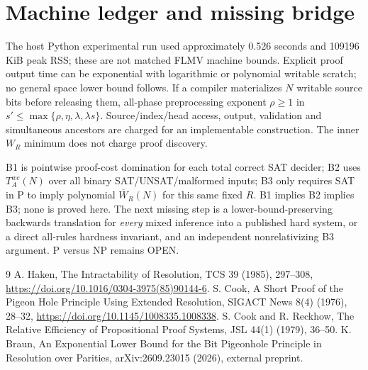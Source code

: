 \documentclass[11pt]{article}
\begin{document}
\section*{Machine ledger and missing bridge}
The host Python experimental run used approximately 0.526 seconds and 109196 KiB peak RSS; these are not matched FLMV machine bounds. Explicit proof output time can be exponential with logarithmic or polynomial writable scratch; no general space lower bound follows. If a compiler materializes $N$ writable source bits before releasing them, all-phase preprocessing exponent $\rho\ge1$ in $s'\le\max\{\rho,\eta,\lambda,\lambda s\}$. Source/index/head access, output, validation and simultaneous ancestors are charged for an implementable construction. The inner $W_R$ minimum does not charge proof discovery.

B1 is pointwise proof-cost domination for each total correct SAT decider; B2 uses $T_A^{wc}(N)$ over all binary SAT/UNSAT/malformed inputs; B3 only requires SAT in P to imply polynomial $\overline W_R(N)$ for this same fixed $R$. B1 implies B2 implies B3; none is proved here. The next missing step is a lower-bound-preserving backwards translation for \emph{every} mixed inference into a published hard system, or a direct all-rules hardness invariant, and an independent nonrelativizing B3 argument. P versus NP remains OPEN.

\begin{thebibliography}{9}
 A. Haken, The Intractability of Resolution, TCS 39 (1985), 297--308, \url{https://doi.org/10.1016/0304-3975(85)90144-6}.
 S. Cook, A Short Proof of the Pigeon Hole Principle Using Extended Resolution, SIGACT News 8(4) (1976), 28--32, \url{https://doi.org/10.1145/1008335.1008338}.
 S. Cook and R. Reckhow, The Relative Efficiency of Propositional Proof Systems, JSL 44(1) (1979), 36--50.
 K. Braun, An Exponential Lower Bound for the Bit Pigeonhole Principle in Resolution over Parities, arXiv:2609.23015 (2026), external preprint.
\end{thebibliography}
\end{document}
